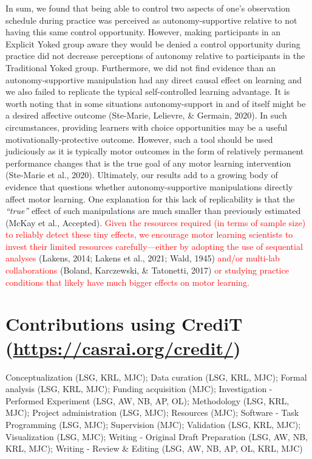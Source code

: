 \documentclass[
  english,
  man, donotrepeattitle,floatsintext]{apa7}
\begin{document}
In sum, we found that being able to control two aspects of one's observation schedule during practice was perceived as autonomy-supportive relative to not having this same control opportunity. However, making participants in an Explicit Yoked group aware they would be denied a control opportunity during practice did not decrease perceptions of autonomy relative to participants in the Traditional Yoked group. Furthermore, we did not find evidence than an autonomy-supportive manipulation had any direct causal effect on learning and we also failed to replicate the typical self-controlled learning advantage. It is worth noting that in some situations autonomy-support in and of itself might be a desired affective outcome (Ste-Marie, Lelievre, \& Germain, 2020). In such circumstances, providing learners with choice opportunities may be a useful motivationally-protective outcome. However, such a tool should be used judiciously as it is typically motor outcomes in the form of relatively permanent performance changes that is the true goal of any motor learning intervention (Ste-Marie et al., 2020). Ultimately, our results add to a growing body of evidence that questions whether autonomy-supportive manipulations directly affect motor learning. One explanation for this lack of replicability is that the \emph{``true''} effect of such manipulations are much smaller than previously estimated (McKay et al., Accepted). \textcolor{red}{Given the resources required (in terms of sample size) to reliably detect these tiny effects, we encourage motor learning scientists to invest their limited resources carefully---either by adopting the use of sequential analyses} (Lakens, 2014; Lakens et al., 2021; Wald, 1945) \textcolor{red}{and/or multi-lab collaborations} (Boland, Karczewski, \& Tatonetti, 2017) \textcolor{red}{or studying practice conditions that likely have much bigger effects on motor learning.}

\vfill

\hypertarget{contributions-using-credit-httpscasrai.orgcredit}{%
\section{\texorpdfstring{Contributions using CrediT (\url{https://casrai.org/credit/})}{Contributions using CrediT (https://casrai.org/credit/)}}\label{contributions-using-credit-httpscasrai.orgcredit}}

Conceptualization (LSG, KRL, MJC); Data curation (LSG, KRL, MJC); Formal analysis (LSG, KRL, MJC); Funding acquisition (MJC); Investigation - Performed Experiment (LSG, AW, NB, AP, OL); Methodology (LSG, KRL, MJC); Project administration (LSG, MJC); Resources (MJC); Software - Task Programming (LSG, MJC); Supervision (MJC); Validation (LSG, KRL, MJC); Visualization (LSG, MJC); Writing - Original Draft Preparation (LSG, AW, NB, KRL, MJC); Writing - Review \& Editing (LSG, AW, NB, AP, OL, KRL, MJC)
\end{document}
